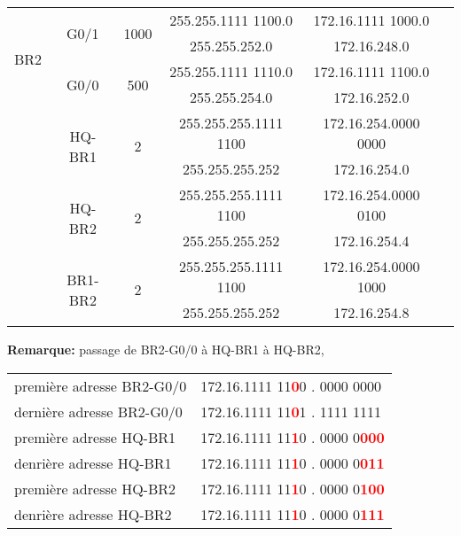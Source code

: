 \documentclass[a4paper]{article}
\begin{document}
\begin{itemize}
\begin{center}
\begin{tabular}{|c|c|c|c|c|c|}
        \multirow{4}{*}{BR2}
        & \multirow{2}{*}{G0/1} & \multirow{2}{*}{1000}
        & 255.255.1111 1100.0 & 172.16.1111 1000.0 \\
        &&& 255.255.252.0 & 172.16.248.0 \\
        & \multirow{2}{*}{G0/0} & \multirow{2}{*}{500}
        & 255.255.1111 1110.0 & 172.16.1111 1100.0 \\
        &&& 255.255.254.0 & 172.16.252.0 \\ \hline

        & \multirow{2}{*}{HQ-BR1} & \multirow{2}{*}{2}
        & 255.255.255.1111 1100 & 172.16.254.0000 0000 \\
        &&& 255.255.255.252 & 172.16.254.0 \\ \hline

        & \multirow{2}{*}{HQ-BR2} & \multirow{2}{*}{2}
        & 255.255.255.1111 1100 & 172.16.254.0000 0100 \\
        &&& 255.255.255.252 & 172.16.254.4 \\ \hline

        & \multirow{2}{*}{BR1-BR2} & \multirow{2}{*}{2}
        & 255.255.255.1111 1100 & 172.16.254.0000 1000 \\
        &&& 255.255.255.252 & 172.16.254.8 \\ \hline
    \end{tabular}
\end{center}
\textbf{Remarque:} passage de BR2-G0/0 à HQ-BR1 à HQ-BR2,
\begin{center}
    \begin{tabular}{ll}
        première adresse BR2-G0/0 & 172.16.1111 11\textcolor{red}{\textbf{0}}0 . 0000 0000 \\
        dernière adresse BR2-G0/0 & 172.16.1111 11\textcolor{red}{\textbf{0}}1 . 1111 1111 \\
        première adresse HQ-BR1 &   172.16.1111 11\textcolor{red}{\textbf{1}}0 . 0000 0\textcolor{red}{\textbf{000}} \\
        denrière adresse HQ-BR1 &   172.16.1111 11\textcolor{red}{\textbf{1}}0 . 0000 0\textcolor{red}{\textbf{011}} \\
        première adresse HQ-BR2 &   172.16.1111 11\textcolor{red}{\textbf{1}}0 . 0000 0\textcolor{red}{\textbf{100}} \\
        denrière adresse HQ-BR2 &   172.16.1111 11\textcolor{red}{\textbf{1}}0 . 0000 0\textcolor{red}{\textbf{111}} \\
    \end{tabular}
\end{center}






\end{itemize}
\end{document}
